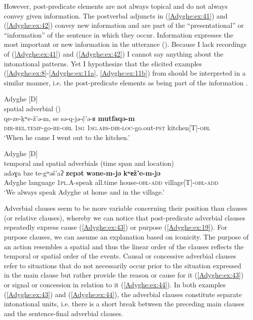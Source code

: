 \documentclass[output=paper,colorlinks,citecolor=brown, draft]{langscibook}
\begin{document}
However, post-predicate elements are not always topical and do not always convey given information. The postverbal adjuncts in (\ref{Adyghe:ex:41}) and (\ref{Adyghe:ex:42}) convey new information and are part of the ``presentational'' or ``information''  of the sentence in which they occur. Information  expresses the most important or new information in the utterance (\citealt{krifka2007basic}). Because I lack recordings of (\ref{Adyghe:ex:41}) and (\ref{Adyghe:ex:42}) I cannot say anything about the intonational patterns. Yet I hypothesize that the elicited examples (\ref{Adyghe:ex:8}-\ref{Adyghe:ex:11a}, \ref{Adyghe:ex:11b}) from \citet[91]{jakovlev1941grammatika} should be interpreted in a similar manner, i.e. the post-predicate elements as being part of the information .

\ea\label{Adyghe:ex:41}
Adyghe \citep[255]{hohlig1997kontaktbedingter} [D] \\
spatial adverbial () \\
\gll qe-ze-ḳʷe-ž'ə-m, se sə-q-jə-č̣'ə-ʁ \textbf{mutfaqə-m} \\
\textsc{dir-}\textsc{rel.temp-}go\textsc{-re-obl} \textsc{1sg} \textsc{1sg.}\textsc{abs-}\textsc{dir-}\textsc{loc-}go.out\textsc{-pst} kitchen[T]\textsc{-obl} \\
 `When he came I went out to the kitchen.'
\z

\newpage
\ea\label{Adyghe:ex:42}
Adyghe \citep[274]{hohlig1997kontaktbedingter} [D] \\
temporal and spatial adverbials (time span and location) \\
\gll adəɣa bze te-gʷəš'aʔ \textbf{zepət} \textbf{wəne-m-jə} \textbf{kʷеž'e-m-jə} \\
Adyghe language \textsc{1pl.A}-speak all.time house\textsc{-obl}\textsc{-add} village[T]\textsc{-obl}\textsc{-add} \\
 `We always speak Adyghe at home and in the village.' 
\z

\begin{sloppypar}
Adverbial clauses seem to be more variable concerning their position than  clauses (or relative clauses), whereby we can notice that post-predicate adverbial clauses repeatedly express cause (\ref{Adyghe:ex:43}) or purpose (\ref{Adyghe:ex:19}). For purpose clauses, we can assume an explanation based on iconicity. The purpose of an action resembles a spatial  and thus the linear order of the clauses reflects the temporal or spatial order of the events. Causal or concessive adverbial clauses refer to situations that do not necessarily occur prior to the situation expressed in the main clause but rather provide the reason or cause for it (\ref{Adyghe:ex:43}) or signal  or concession in relation to it (\ref{Adyghe:ex:44}). In both examples (\ref{Adyghe:ex:43}) and (\ref{Adyghe:ex:44}), the adverbial clauses constitute separate intonational units, i.e. there is a short break between the preceding main clauses and the sentence-final adverbial clauses. 
\end{sloppypar}
\end{document}
